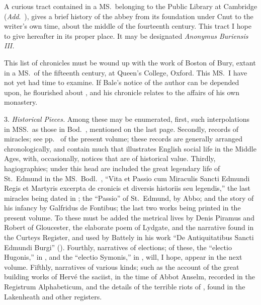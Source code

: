 \documentclass[10pt]{book}
\begin{document}
{A curious tract contained in a MS.\ belonging to the Public Library at Cambridge (\emph{Add}.\ ), gives a brief history of the abbey from its foundation under Cnut to the writer's own time, about the middle of the fourteenth century. This tract I hope to give hereafter in its proper place. It may be designated \emph{Anonymus Buriensis III.}

This list of chronicles must be wound up with the work of Boston of Bury, extant in a MS.\ of the fifteenth century, at Queen's College, Oxford. This MS.\ I have not yet had time to examine. If Bale's notice of the author can be depended upon, he flourished about , and his chronicle relates to the affairs of his own monastery.

3. \emph{Historical Pieces.} Among these may be enumerated, first, such interpolations in MSS.\ as those in Bod.\ , mentioned on the last page. Secondly, records of miracles; see pp.\  of the present volume; these records are generally arranged chronologically, and contain much that illustrates English social life in the Middle Ages, with, occasionally, notices that are of historical value. Thirdly, hagiographies; under this head are included the great legendary life of St.\ Edmund in the MS.\ Bodl.\ , ``Vita et Passio cum Miraculis Sancti Edmundi Regis et Martyris excerpta de cronicis et diversis historiis seu legendis,'' the last miracles being dated in ; the ``Passio'' of St.\ Edmund, by Abbo; and the story of his infancy by Galfridus de Fontibus; the last two works being printed in the present volume. To these must be added the metrical lives by Denis Piramus and Robert of Gloucester, the elaborate poem of Lydgate, and the narrative found in the Curteys Register, and used by Battely in his work ``De Antiquitatibus Sancti Edmundi Burgi'' (). Fourthly, narratives of elections; of these, the ``electio Hugonis,'' in , and the ``electio Symonis,'' in , will, I hope, appear in the next volume. Fifthly, narratives of various kinds; such as the account of the great building works of Hervé the saciist, in the time of Abbot Anselm, recorded in the Registrum Alphabeticum, and the details of the terrible riots of , found in the Lakenheath and other registers.






}
\end{document}
